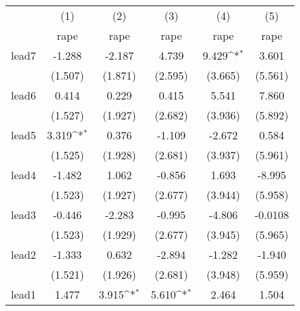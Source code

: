 {
\def\sym#1{\ifmmode^{#1}\else\(^{#1}\)\fi}
\begin{tabular}{l*{5}{c}}
\hline\hline
            &\multicolumn{1}{c}{(1)}&\multicolumn{1}{c}{(2)}&\multicolumn{1}{c}{(3)}&\multicolumn{1}{c}{(4)}&\multicolumn{1}{c}{(5)}\\
            &\multicolumn{1}{c}{rape}&\multicolumn{1}{c}{rape}&\multicolumn{1}{c}{rape}&\multicolumn{1}{c}{rape}&\multicolumn{1}{c}{rape}\\
\hline
lead7       &      -1.288         &      -2.187         &       4.739         &       9.429\sym{*}  &       3.601         \\
            &     (1.507)         &     (1.871)         &     (2.595)         &     (3.665)         &     (5.561)         \\
[1em]
lead6       &       0.414         &       0.229         &       0.415         &       5.541         &       7.860         \\
            &     (1.527)         &     (1.927)         &     (2.682)         &     (3.936)         &     (5.892)         \\
[1em]
lead5       &       3.319\sym{*}  &       0.376         &      -1.109         &      -2.672         &       0.584         \\
            &     (1.525)         &     (1.928)         &     (2.681)         &     (3.937)         &     (5.961)         \\
[1em]
lead4       &      -1.482         &       1.062         &      -0.856         &       1.693         &      -8.995         \\
            &     (1.523)         &     (1.927)         &     (2.677)         &     (3.944)         &     (5.958)         \\
[1em]
lead3       &      -0.446         &      -2.283         &      -0.995         &      -4.806         &     -0.0108         \\
            &     (1.523)         &     (1.929)         &     (2.677)         &     (3.945)         &     (5.965)         \\
[1em]
lead2       &      -1.333         &       0.632         &      -2.894         &      -1.282         &      -1.940         \\
            &     (1.521)         &     (1.926)         &     (2.681)         &     (3.948)         &     (5.959)         \\
[1em]
lead1       &       1.477         &       3.915\sym{*}  &       5.610\sym{*}  &       2.464         &       1.504         \\

\end{tabular}}
